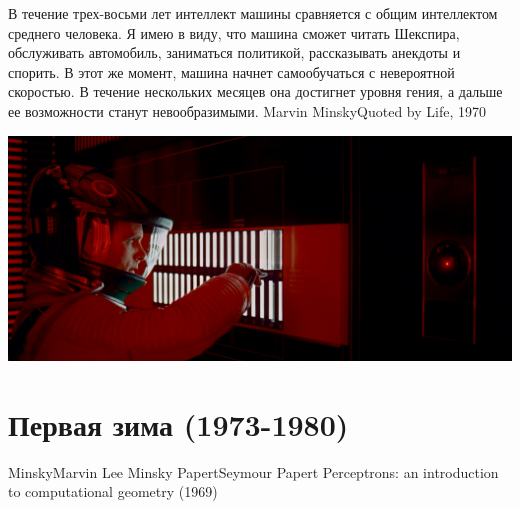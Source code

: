 \documentclass[24pt,pdf,hyperref={unicode},aspectratio=169]{beamer}
\begin{document}
\begin{frame}
\end{frame}

\begin{frame}
\end{frame}


\begin{frame}
\end{frame}


\begin{frame}
\citate
{
В течение трех-восьми лет интеллект машины сравняется с общим интеллектом среднего человека. Я имею в виду, что машина сможет читать Шекспира, обслуживать автомобиль, заниматься политикой, рассказывать анекдоты и спорить. В этот же момент, машина начнет самообучаться с невероятной скоростью. В течение нескольких месяцев она достигнет уровня гения, а дальше ее возможности станут невообразимыми. 
}{Marvin Minsky}{Quoted by Life, 1970}
\end{frame}

\begin{frame}
\includegraphics[width=\textwidth]{Portraits/HAL9000.jpg}
\end{frame}


\section{Первая зима (1973-1980)}

\begin{frame}


\doublebio
{Minsky}{Marvin Lee Minsky}
{Papert}{Seymour Papert}
{Perceptrons: an introduction to computational geometry (1969)}

\end{frame}
\end{document}

